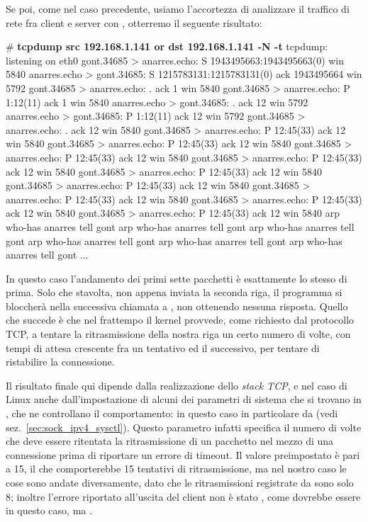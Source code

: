 Se poi, come nel caso precedente, usiamo l'accortezza di analizzare il
traffico di rete fra client e server con , otterremo il seguente
risultato:
\begin{Console}
# \textbf{tcpdump src 192.168.1.141 or dst 192.168.1.141 -N -t}
tcpdump: listening on eth0
gont.34685 > anarres.echo: S 1943495663:1943495663(0) win 5840
anarres.echo > gont.34685: S 1215783131:1215783131(0) ack 1943495664 win 5792 
gont.34685 > anarres.echo: . ack 1 win 5840
gont.34685 > anarres.echo: P 1:12(11) ack 1 win 5840 
anarres.echo > gont.34685: . ack 12 win 5792 
anarres.echo > gont.34685: P 1:12(11) ack 12 win 5792 
gont.34685 > anarres.echo: . ack 12 win 5840 
gont.34685 > anarres.echo: P 12:45(33) ack 12 win 5840 
gont.34685 > anarres.echo: P 12:45(33) ack 12 win 5840 
gont.34685 > anarres.echo: P 12:45(33) ack 12 win 5840 
gont.34685 > anarres.echo: P 12:45(33) ack 12 win 5840 
gont.34685 > anarres.echo: P 12:45(33) ack 12 win 5840 
gont.34685 > anarres.echo: P 12:45(33) ack 12 win 5840 
gont.34685 > anarres.echo: P 12:45(33) ack 12 win 5840 
gont.34685 > anarres.echo: P 12:45(33) ack 12 win 5840 
gont.34685 > anarres.echo: P 12:45(33) ack 12 win 5840 
arp who-has anarres tell gont
arp who-has anarres tell gont
arp who-has anarres tell gont
arp who-has anarres tell gont
arp who-has anarres tell gont
arp who-has anarres tell gont
...
\end{Console}

In questo caso l'andamento dei primi sette pacchetti è esattamente lo stesso
di prima. Solo che stavolta, non appena inviata la seconda riga, il programma
si bloccherà nella successiva chiamata a , non ottenendo nessuna
risposta. Quello che succede è che nel frattempo il kernel provvede, come
richiesto dal protocollo TCP, a tentare la ritrasmissione della nostra riga un
certo numero di volte, con tempi di attesa crescente fra un tentativo ed il
successivo, per tentare di ristabilire la connessione.

Il risultato finale qui dipende dalla realizzazione dello \textit{stack TCP},
e nel caso di Linux anche dall'impostazione di alcuni dei parametri di sistema
che si trovano in , che ne controllano il
comportamento: in questo caso in particolare da
 (vedi
sez.~\ref{sec:sock_ipv4_sysctl}). Questo parametro infatti specifica il numero
di volte che deve essere ritentata la ritrasmissione di un pacchetto nel mezzo
di una connessione prima di riportare un errore di timeout.  Il valore
preimpostato è pari a 15, il che comporterebbe 15 tentativi di ritrasmissione,
ma nel nostro caso le cose sono andate diversamente, dato che le
ritrasmissioni registrate da  sono solo 8; inoltre l'errore
riportato all'uscita del client non è stato , come dovrebbe
essere in questo caso, ma .

